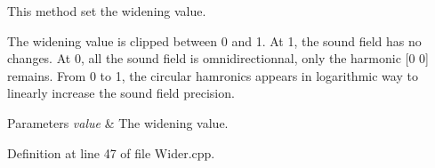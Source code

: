 This method set the widening value. 

The widening value is clipped between 0 and 1. At 1, the sound field has no changes. At 0, all the sound field is omnidirectionnal, only the harmonic \mbox{[}0 0\mbox{]} remains. From 0 to 1, the circular hamronics appears in logarithmic way to linearly increase the sound field precision.


\begin{DoxyParams}{Parameters}
{\em value} & The widening value. \\
\hline
\end{DoxyParams}


Definition at line 47 of file Wider.\-cpp.

